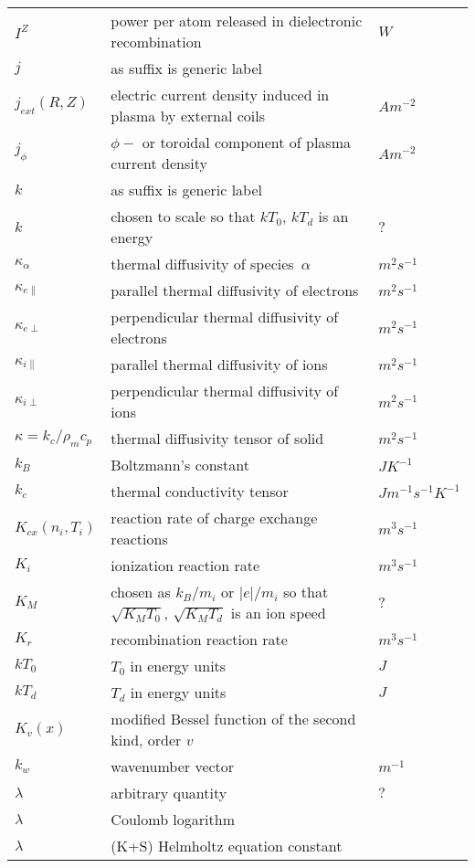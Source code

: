 \begin{longtable}{|p{3.0cm}|p{10.0cm}|p{3.0cm}|}
$I^Z$ & power per atom released in dielectronic recombination  & $W$ \\
$j$ & as suffix is generic label & \\
$j_{ext}(R,Z)$ & electric current density induced in plasma by external coils  & $A m^{-2}$ \\
$j_\phi$ & $\phi-$ or toroidal component of plasma current density  & $A m^{-2}$ \\
$k$ & as suffix is generic label & \\
$k$ & chosen to scale so that $kT_0$, $kT_d$ is an energy & $?$ \\
$\kappa_\alpha$ & thermal diffusivity of species~$\alpha$ & $m^2 s^{-1}$ \\
$\kappa_{e\|}$ & parallel thermal diffusivity of electrons & $m^2 s^{-1}$ \\
$\kappa_{e\perp}$ & perpendicular thermal diffusivity of electrons & $m^2 s^{-1}$ \\
$\kappa_{i\|}$ & parallel thermal diffusivity of ions & $m^2 s^{-1}$ \\
$\kappa_{i\perp}$ & perpendicular thermal diffusivity of ions & $m^2 s^{-1}$ \\
$\kappa=k_c/\rho_m c_p$ & thermal diffusivity tensor of solid & $m^2 s^{-1}$ \\
$k_B$ & Boltzmann's constant  & $J K^{-1}$ \\
$k_c$ & thermal conductivity tensor  & $J m^{-1} s^{-1} K^{-1}$ \\
$K_{cx}\left( n_i, T_i \right)$ & reaction rate of charge exchange reactions  & $m^3 s^{-1}$ \\
$K_i$ & ionization reaction rate  & $m^3 s^{-1}$ \\
$K_M$ & chosen as $k_B/m_i$ or $|e|/m_i$ so that $\sqrt{K_MT_0}$, $\sqrt{K_MT_d}$ is an ion speed & $?$ \\
$K_r$ & recombination reaction rate  & $m^3 s^{-1}$ \\
$kT_0$ & $T_0$ in energy units  & $J$ \\
$kT_d$ & $T_d$ in energy units  & $J$ \\
$K_v(x)$ & modified Bessel function of the second kind, order $v$  & \\
$k_w$ & wavenumber vector & $m^{-1}$ \\
$\lambda$ & arbitrary quantity  & $?$ \\
$\lambda$ & Coulomb logarithm & \\
$\lambda$ &  (K+S) Helmholtz equation constant & \\

\end{longtable}
